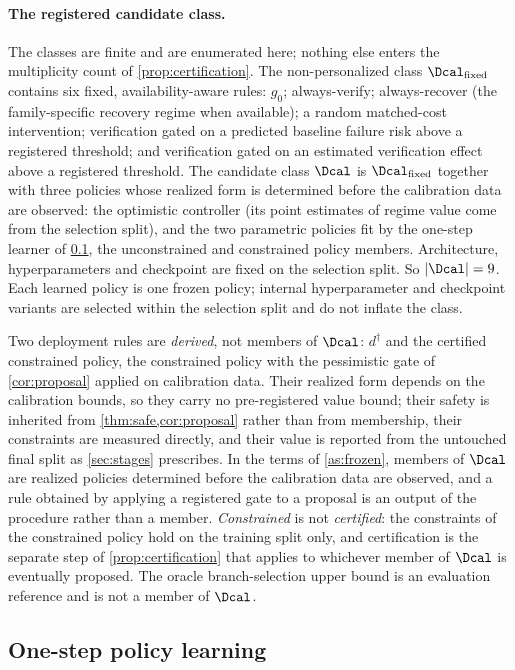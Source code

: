 \paragraph{The registered candidate class.}
The classes are finite and are enumerated here; nothing else enters the
multiplicity count of \cref{prop:certification}.  The non-personalized class
$\Dcal_{\mathrm{fixed}}$ contains six fixed, availability-aware rules: $g_0$;
always-verify; always-recover (the family-specific recovery regime when
available); a random matched-cost intervention; verification gated on a
predicted baseline failure risk above a registered threshold; and verification
gated on an estimated verification effect above a registered threshold.  The
candidate class $\Dcal$ is $\Dcal_{\mathrm{fixed}}$ together with three
policies whose realized form is determined before the calibration data are
observed: the optimistic controller (its point estimates of regime value come
from the selection split), and the two parametric policies fit by the one-step
learner of \cref{sec:rl}, the unconstrained and constrained policy members.
Architecture, hyperparameters and checkpoint are fixed on the selection split.
So $|\Dcal|=9$.  Each learned policy is one frozen policy; internal hyperparameter
and checkpoint variants are selected within the selection split and do not
inflate the class.

Two deployment rules are \emph{derived}, not members of $\Dcal$: $d^\dagger$
and the certified constrained policy, the constrained policy with
the pessimistic gate of \cref{cor:proposal} applied on calibration data.  Their
realized form depends on the calibration bounds, so they carry no
pre-registered value bound; their safety is inherited from
\cref{thm:safe,cor:proposal} rather than from membership, their constraints are
measured directly, and their value is reported from the untouched final split as
\cref{sec:stages} prescribes.  In the terms of \cref{as:frozen}, members of
$\Dcal$ are realized policies determined before the calibration data are
observed, and a rule obtained by applying a registered gate to a proposal is an
output of the procedure rather than a member.  \emph{Constrained} is not
\emph{certified}: the constraints of the constrained policy hold
on the training split only, and certification is the separate step of
\cref{prop:certification} that applies to whichever member of $\Dcal$ is
eventually proposed.  The oracle branch-selection upper bound is an evaluation
reference and is not a member of $\Dcal$.

\subsection{One-step policy learning}
\label{sec:rl}

